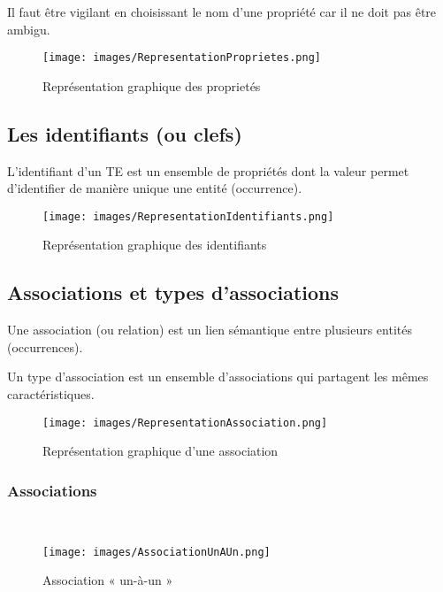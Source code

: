 \documentclass[10pt]{article}
\begin{document}
			Il faut être vigilant en choisissant le nom d'une propriété car il ne doit pas être ambigu.

			\begin{figure}[H]
				\begin{center}
					\texttt{[image: images/RepresentationProprietes.png]}
				\end{center}
				\caption{Représentation graphique des proprietés}
			\end{figure}
			
		\subsection{Les identifiants (ou clefs)}
			L'identifiant d'un TE est un ensemble de propriétés dont la valeur permet d'identifier de manière unique une entité (occurrence).
			
			\begin{figure}[H]
				\begin{center}
					\texttt{[image: images/RepresentationIdentifiants.png]}
				\end{center}
				\caption{Représentation graphique des identifiants}
			\end{figure}
			
		\subsection{Associations et types d'associations}
			Une association (ou relation) est un lien sémantique entre plusieurs entités (occurrences).
			
			Un type d'association est un ensemble d'associations qui partagent les mêmes caractéristiques.
			
			\begin{figure}[H]
				\begin{center}
					\texttt{[image: images/RepresentationAssociation.png]}
				\end{center}
				\caption{Représentation graphique d'une association}
			\end{figure}
			
			\subsubsection{Associations}
			~\\
				\begin{figure}[H]
					\begin{center}
						\texttt{[image: images/AssociationUnAUn.png]}
					\end{center}
					\caption{Association « un-à-un »}
				\end{figure}
				
\end{document}
